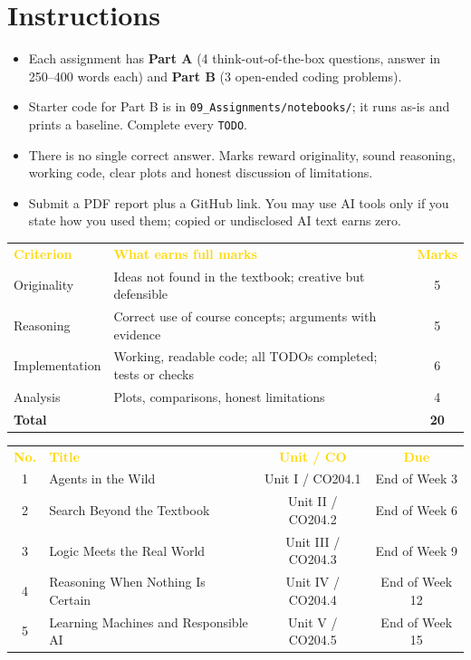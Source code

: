 \documentclass[11pt]{article}
\begin{document}
\section*{Instructions}
\begin{itemize}\item Each assignment has \textbf{Part A} (4 think-out-of-the-box questions, answer in 250--400 words each) and \textbf{Part B} (3 open-ended coding problems).
\item Starter code for Part B is in \texttt{09\_Assignments/notebooks/}; it runs as-is and prints a baseline. Complete every \texttt{TODO}.
\item There is no single correct answer. Marks reward originality, sound reasoning, working code, clear plots and honest discussion of limitations.
\item Submit a PDF report plus a GitHub link. You may use AI tools only if you state how you used them; copied or undisclosed AI text earns zero.\end{itemize}
\begin{center}\begin{tabular}{l p{9.5cm} c}\rowcolor{navy}\textcolor{gold}{\textbf{Criterion}}&\textcolor{gold}{\textbf{What earns full marks}}&\textcolor{gold}{\textbf{Marks}}\\
Originality&Ideas not found in the textbook; creative but defensible&5\\
\rowcolor{ivory}Reasoning&Correct use of course concepts; arguments with evidence&5\\
Implementation&Working, readable code; all TODOs completed; tests or checks&6\\
\rowcolor{ivory}Analysis&Plots, comparisons, honest limitations&4\\\midrule
\textbf{Total}&&\textbf{20}\\\end{tabular}\end{center}
\begin{center}\begin{tabular}{c l c c}\rowcolor{navy}\textcolor{gold}{\textbf{No.}}&\textcolor{gold}{\textbf{Title}}&\textcolor{gold}{\textbf{Unit / CO}}&\textcolor{gold}{\textbf{Due}}\\
1&Agents in the Wild&Unit I / CO204.1&End of Week 3\\
\rowcolor{ivory}2&Search Beyond the Textbook&Unit II / CO204.2&End of Week 6\\
3&Logic Meets the Real World&Unit III / CO204.3&End of Week 9\\
\rowcolor{ivory}4&Reasoning When Nothing Is Certain&Unit IV / CO204.4&End of Week 12\\
5&Learning Machines and Responsible AI&Unit V / CO204.5&End of Week 15\\
\end{tabular}\end{center}
\newpage
{}
\end{document}
